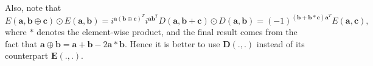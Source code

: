 \documentclass[lettersize,journal,onecolumn]{IEEEtran}
\begin{document}
 \noindent Also, note that 
 \begin{equation*}
 	E(\mathbf{a,b\oplus c}) \odot E(\mathbf{a,b}) = i^{\mathbf{a}(\mathbf{b\oplus c})^T}i^{\mathbf{a}\mathbf{b}^T}D(\mathbf{a,b+c}) \odot D(\mathbf{a,b}) = (-1)^{(\mathbf{b+b}*\mathbf{c})\mathbf{a}^T} E(\mathbf{a,c}),
 \end{equation*}
 where $*$ denotes the element-wise product, and the final result comes from the fact that $\mathbf{a}\oplus \mathbf{b} = \mathbf{a+b}-2\mathbf{a}*\mathbf{b}$. Hence it is better to use $\mathbf{D}(.,.)$ instead of its counterpart $\mathbf{E}(.,.)$.
  
\end{document}
